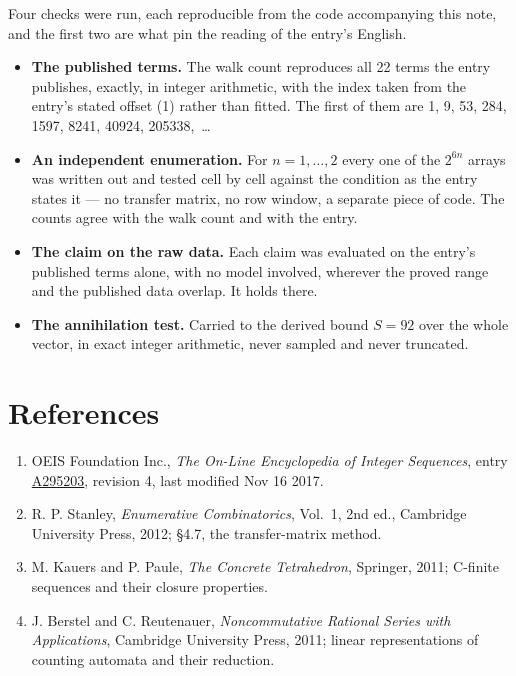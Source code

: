\documentclass[11pt]{article}
\theoremstyle{definition}
\begin{document}
Four checks were run, each reproducible from the code accompanying this note, and the first two are what pin the reading of the entry's English.

\begin{itemize}

\item {\bfseries The published terms.} The walk count reproduces all 22 terms the entry publishes, exactly, in integer arithmetic, with the index taken from the entry's stated offset (1) rather than fitted. The first of them are 1, 9, 53, 284, 1597, 8241, 40924, 205338,~\dots

\item {\bfseries An independent enumeration.} For $n = 1,\dots,2$ every one of the $2^{6n}$ arrays was written out and tested cell by cell against the condition as the entry states it --- no transfer matrix, no row window, a separate piece of code. The counts agree with the walk count and with the entry.

\item {\bfseries The claim on the raw data.} Each claim was evaluated on the entry's published terms alone, with no model involved, wherever the proved range and the published data overlap. It holds there.

\item {\bfseries The annihilation test.} Carried to the derived bound $S = 92$ over the whole vector, in exact integer arithmetic, never sampled and never truncated.

\end{itemize}

\section{References}

\begin{enumerate}

\item OEIS Foundation Inc., \emph{The On-Line Encyclopedia of Integer Sequences}, entry \href{https://oeis.org/A295203}{A295203}, revision 4, last modified Nov 16 2017.

\item R. P. Stanley, \emph{Enumerative Combinatorics}, Vol.~1, 2nd ed., Cambridge University Press, 2012; \S4.7, the transfer-matrix method.

\item M. Kauers and P. Paule, \emph{The Concrete Tetrahedron}, Springer, 2011; C-finite sequences and their closure properties.

\item J. Berstel and C. Reutenauer, \emph{Noncommutative Rational Series with Applications}, Cambridge University Press, 2011; linear representations of counting automata and their reduction.

\end{enumerate}
\end{document}
